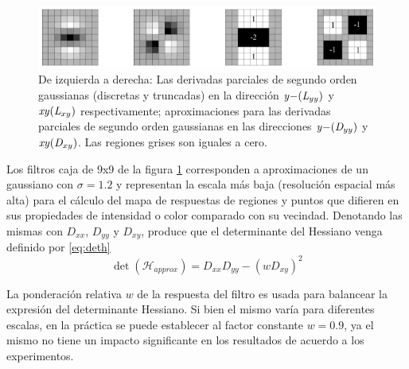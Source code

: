 \begin{figure}[tbhp]
   \centering
        \includegraphics[scale=0.4]{./figs/gaussiansapproximationskernels}
    \caption[Kernels gaussianos aproximados y discretizados]{De izquierda a derecha: Las derivadas parciales de segundo orden gaussianas (discretas y truncadas) en la dirección $\mathit{y-}\hphantom{}(\mathit{L}_{yy})$ y $\mathit{xy}\hphantom{}(\mathit{L}_{xy})$ respectivamente; aproximaciones para las derivadas parciales de segundo orden gaussianas en las direcciones $\mathit{y-}\hphantom{}(\mathit{D}_{yy})$ y $\mathit{xy}\hphantom{}(\mathit{D}_{xy})$. Las regiones grises son iguales a cero.}
   \label{fig:gaussiansapproximationskernels}                %
\end{figure}

Los filtros caja de 9x9 de la figura \ref{fig:gaussiansapproximationskernels} corresponden a aproximaciones de un gaussiano con $\sigma=1.2$ y representan la escala más baja (resolución espacial más alta) para el cálculo del mapa de respuestas de regiones y puntos que difieren en sus propiedades de intensidad o color comparado con su vecindad. Denotando las mismas con $\mathit{D}_{xx}$, $\mathit{D}_{yy}$ y $\mathit{D}_{xy}$, produce que el determinante del Hessiano venga definido por \ref{eq:deth}
\begin{equation}
\label{eq:deth}
\det(\mathcal{H}_{approx})=D_{xx}D_{yy}-(wD_{xy})^{2} 
\end{equation}


La ponderación relativa $w$ de la respuesta del filtro es usada para balancear la expresión del determinante Hessiano. Si bien el mismo varía para diferentes escalas, en la práctica se puede establecer al factor constante $w=0.9$, ya el  mismo no tiene un impacto significante en los resultados de acuerdo a los experimentos. %

